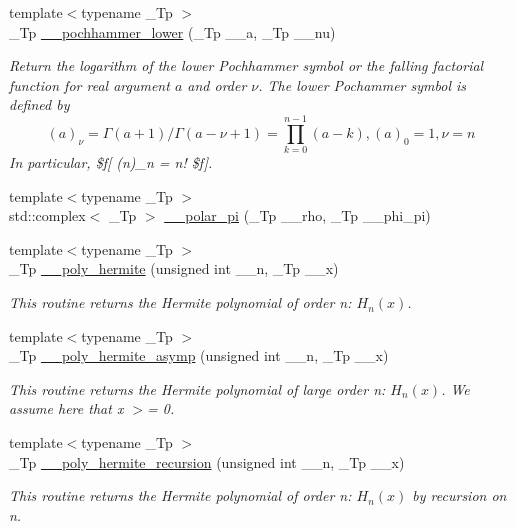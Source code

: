 \begin{DoxyCompactItemize}
{\footnotesize template$<$typename \+\_\+\+Tp $>$ }\\\+\_\+\+Tp \hyperlink{namespacestd_1_1____detail_afa62487960a1980a21688783d3410afc}{\+\_\+\+\_\+pochhammer\+\_\+lower} (\+\_\+\+Tp \+\_\+\+\_\+a, \+\_\+\+Tp \+\_\+\+\_\+nu)
\begin{DoxyCompactList}\small\item\em Return the logarithm of the lower Pochhammer symbol or the falling factorial function for real argument $ a $ and order $ \nu $. The lower Pochammer symbol is defined by \[ (a)_\nu = \Gamma(a + 1) / \Gamma(a - \nu + 1) = \prod_{k=0}^{n-1} (a - k), (a)_0 = 1, \nu = n \] In particular, \$f\mbox{[} (n)\+\_\+n = n! \$f\mbox{]}. \end{DoxyCompactList}\item 
{\footnotesize template$<$typename \+\_\+\+Tp $>$ }\\std\+::complex$<$ \+\_\+\+Tp $>$ \hyperlink{namespacestd_1_1____detail_ac69e259ad511fcc7a54c6ec315adcfa4}{\+\_\+\+\_\+polar\+\_\+pi} (\+\_\+\+Tp \+\_\+\+\_\+rho, \+\_\+\+Tp \+\_\+\+\_\+phi\+\_\+pi)
\item 
{\footnotesize template$<$typename \+\_\+\+Tp $>$ }\\\+\_\+\+Tp \hyperlink{namespacestd_1_1____detail_aca2f5400ce1d8ee26b9e0e9da74bda2c}{\+\_\+\+\_\+poly\+\_\+hermite} (unsigned int \+\_\+\+\_\+n, \+\_\+\+Tp \+\_\+\+\_\+x)
\begin{DoxyCompactList}\small\item\em This routine returns the Hermite polynomial of order n\+: $ H_n(x) $. \end{DoxyCompactList}\item 
{\footnotesize template$<$typename \+\_\+\+Tp $>$ }\\\+\_\+\+Tp \hyperlink{namespacestd_1_1____detail_a34d8e6d2be42c2e9abb21a3090725912}{\+\_\+\+\_\+poly\+\_\+hermite\+\_\+asymp} (unsigned int \+\_\+\+\_\+n, \+\_\+\+Tp \+\_\+\+\_\+x)
\begin{DoxyCompactList}\small\item\em This routine returns the Hermite polynomial of large order n\+: $ H_n(x) $. We assume here that x $>$= 0. \end{DoxyCompactList}\item 
{\footnotesize template$<$typename \+\_\+\+Tp $>$ }\\\+\_\+\+Tp \hyperlink{namespacestd_1_1____detail_a4dbbb56aec75c28da046df01112ba2d0}{\+\_\+\+\_\+poly\+\_\+hermite\+\_\+recursion} (unsigned int \+\_\+\+\_\+n, \+\_\+\+Tp \+\_\+\+\_\+x)
\begin{DoxyCompactList}\small\item\em This routine returns the Hermite polynomial of order n\+: $ H_n(x) $ by recursion on n. \end{DoxyCompactList}\item 

\end{DoxyCompactItemize}
